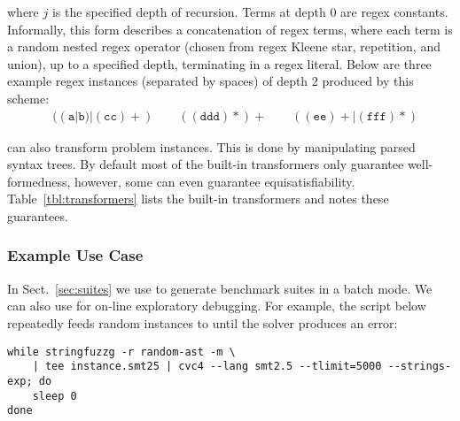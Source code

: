 where $j$ is the specified depth of recursion. Terms at depth 0 are
regex constants. Informally, this form describes a concatenation of
regex terms, where each term is a random nested regex operator (chosen from
regex Kleene star, repetition, and union), up to a specified depth,
terminating in a regex literal. Below are three example regex instances
(separated by spaces) of depth 2 produced by this scheme:
\begin{align*}
    & ((\texttt{a}|\texttt{b})|(\texttt{cc})+)\quad\quad
    ((\texttt{ddd})*)+\quad\quad ((\texttt{ee})+|(\texttt{fff})*)
\end{align*}

\fuzzer{} can also transform problem instances.
This is done by manipulating parsed syntax trees.
By default most of the built-in transformers 
only guarantee well-formedness, however,
some can even guarantee equisatisfiability. Table~\ref{tbl:transformers} 
lists the built-in transformers and notes these guarantees.

\subsubsection{Example Use Case}
In Sect.~\ref{sec:suites} we use \fuzzer{} to generate benchmark suites in a batch mode.
We can also use \fuzzer{} for on-line exploratory debugging. 
For example, the script below repeatedly feeds random \fuzzer{} 
instances to \cvc{} until the solver produces an error:
{\scriptsize\begin{verbatim}
while stringfuzzg -r random-ast -m \
    | tee instance.smt25 | cvc4 --lang smt2.5 --tlimit=5000 --strings-exp; do
    sleep 0
done\end{verbatim}}
